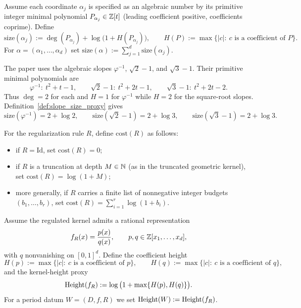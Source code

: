 \begin{definition}
\label{def:slope_size_proxy}
Assume each coordinate $\alpha_j$ is specified as an algebraic number by its primitive integer minimal polynomial $P_{\alpha_j}\in\mathbb{Z}[t]$ (leading coefficient positive, coefficients coprime).
Define
\[
\mathrm{size}(\alpha_j):=\deg(P_{\alpha_j})+\log\big(1+H(P_{\alpha_j})\big),
\qquad
H(P):=\max\{|c|:\ c\text{ is a coefficient of }P\}.
\]
For $\alpha=(\alpha_1,\dots,\alpha_d)$ set $\mathrm{size}(\alpha):=\sum_{j=1}^d \mathrm{size}(\alpha_j)$.
\end{definition}

\begin{example}
\label{ex:slope_sizes}
The paper uses the algebraic slopes $\varphi^{-1}$, $\sqrt{2}-1$, and $\sqrt{3}-1$.
Their primitive minimal polynomials are
\[
\varphi^{-1}:\ t^2+t-1,\qquad
\sqrt{2}-1:\ t^2+2t-1,\qquad
\sqrt{3}-1:\ t^2+2t-2.
\]
Thus $\deg=2$ for each and $H=1$ for $\varphi^{-1}$ while $H=2$ for the square-root slopes.
Definition~\ref{def:slope_size_proxy} gives
\[
\mathrm{size}(\varphi^{-1})=2+\log 2,
\qquad
\mathrm{size}(\sqrt{2}-1)=2+\log 3,
\qquad
\mathrm{size}(\sqrt{3}-1)=2+\log 3.
\]
\end{example}

\begin{definition}
\label{def:reg_cost_proxy}
For the regularization rule $R$, define $\mathrm{cost}(R)$ as follows:
\begin{itemize}
\item if $R=\mathrm{Id}$, set $\mathrm{cost}(R)=0$;
\item if $R$ is a truncation at depth $M\in\mathbb{N}$ (as in the truncated geometric kernel), set $\mathrm{cost}(R)=\log(1+M)$;
\item more generally, if $R$ carries a finite list of nonnegative integer budgets $(b_1,\dots,b_r)$, set $\mathrm{cost}(R)=\sum_{i=1}^r \log(1+b_i)$.
\end{itemize}
\end{definition}

\begin{definition}
\label{def:height_proxy}
Assume the regulated kernel admits a rational representation
\[
f_R(x)=\frac{p(x)}{q(x)},
\qquad
p,q\in\mathbb{Z}[x_1,\dots,x_d],
\]
with $q$ nonvanishing on $[0,1]^d$.
Define the coefficient height
\[
H(p):=\max\{|c|:\ c\text{ is a coefficient of }p\},
\qquad
H(q):=\max\{|c|:\ c\text{ is a coefficient of }q\},
\]
and the kernel-height proxy
\[
\mathrm{Height}(f_R):=\log\big(1+\max\{H(p),H(q)\}\big).
\]
For a period datum $W=(D,f,R)$ we set $\mathrm{Height}(W):=\mathrm{Height}(f_R)$.
\end{definition}

